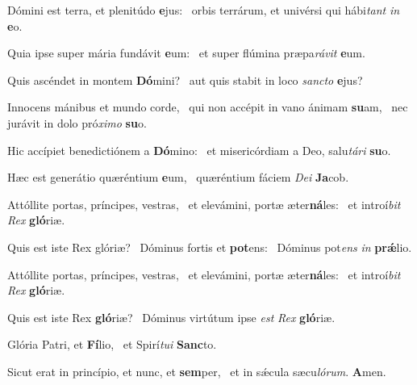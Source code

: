 \item Dómini est terra, et plenitúdo \textbf{e}jus:~\psstar{} orbis terrárum, et univérsi qui hábi\textit{tant} \textit{in} \textbf{e}o.
\item Quia ipse super mária fundávit \textbf{e}um:~\psstar{} et super flúmina præpa\textit{rávit} \textbf{e}um.
\item Quis ascéndet in montem \textbf{Dó}mini?~\psstar{} aut quis stabit in loco \textit{sancto} \textbf{e}jus?
\item Innocens mánibus et mundo corde,~\pscross{} qui non accépit in vano ánimam \textbf{su}am,~\psstar{} nec jurávit in dolo pró\textit{ximo} \textbf{su}o.
\item Hic accípiet benedictiónem a \textbf{Dó}mino:~\psstar{} et misericórdiam a Deo, salu\textit{tári} \textbf{su}o.
\item Hæc est generátio quæréntium \textbf{e}um,~\psstar{} quæréntium fáciem \textit{Dei} \textbf{Ja}cob.
\item Attóllite portas, príncipes, vestras,~\pscross{} et elevámini, portæ æter\textbf{ná}les:~\psstar{} et introí\textit{bit} \textit{Rex} \textbf{gló}riæ.
\item Quis est iste Rex glóriæ?~\pscross{} Dóminus fortis et \textbf{pot}ens:~\psstar{} Dóminus pot\textit{ens} \textit{in} \textbf{prǽ}lio.
\item Attóllite portas, príncipes, vestras,~\pscross{} et elevámini, portæ æter\textbf{ná}les:~\psstar{} et introí\textit{bit} \textit{Rex} \textbf{gló}riæ.
\item Quis est iste Rex \textbf{gló}riæ?~\psstar{} Dóminus virtútum ipse \textit{est} \textit{Rex} \textbf{gló}riæ.
\item Glória Patri, et \textbf{Fí}lio,~\psstar{} et Spirí\textit{tui} \textbf{Sanc}to.
\item Sicut erat in princípio, et nunc, et \textbf{sem}per,~\psstar{} et in sǽcula sæcu\textit{lórum}. \textbf{A}men.
